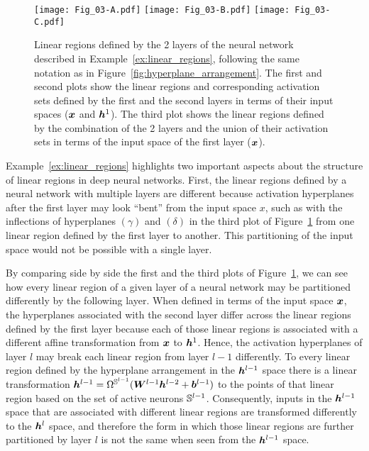 \begin{figure}
    \centering
    \texttt{[image: Fig\_03-A.pdf]}
    \texttt{[image: Fig\_03-B.pdf]} 
    \texttt{[image: Fig\_03-C.pdf]}
    \caption{Linear regions defined by the 2 layers of the neural network described in Example~\ref{ex:linear_regions}, 
    following the same notation as in Figure~\ref{fig:hyperplane_arrangement}. The first and second plots show the linear regions and corresponding activation sets defined by the first and the second layers in terms of their input spaces (${\bm{x}}$ and ${\bm{h}}^1$). The third plot shows the linear regions defined by the combination of the 2 layers and the union of their activation sets in terms of the input space of the first layer (${\bm{x}}$).}
    \label{fig:linear_regions}
\end{figure}

Example~\ref{ex:linear_regions} highlights two important aspects about the structure of linear regions in deep neural networks. 
First, the linear regions defined by a neural network with multiple layers are different because activation hyperplanes after the first layer may look ``bent'' from the input space $x$, 
such as with the inflections of hyperplanes $(\gamma)$ and $(\delta)$ in the third plot of Figure~\ref{fig:linear_regions} from one linear region defined by the first layer to another. 
This partitioning of the input space would not be possible with a single layer. 

By comparing side by side the first and the third plots of Figure~\ref{fig:linear_regions}, 
we can see  how every linear region of a given layer of a neural network may be partitioned differently by the following layer. 
When defined in terms of the input space ${\bm{x}}$, 
the hyperplanes associated with the second layer differ across the linear regions defined by the first layer 
because each of those linear regions is associated with a different affine transformation from ${\bm{x}}$ to ${\bm{h}}^1$. 
Hence, the activation hyperplanes of layer $l$ may break each linear region from layer $l-1$ differently. 
To every linear region defined by the hyperplane arrangement in the ${\bm{h}}^{l-1}$ space there is a linear transformation ${\bm{h}}^{l-1} = \Omega^{{\mathbb{S}}^{l-1}}({\bm{W}}^{l-1} {\bm{h}}^{l-2} + {\bm{b}}^{l-1})$ to the points of that linear region based on the set of active neurons ${\mathbb{S}}^{l-1}$. 
%
Consequently, inputs in the ${\bm{h}}^{l-1}$ space that are associated with different linear regions are transformed differently to the ${\bm{h}}^l$ space, and therefore the form in which those linear regions are further partitioned by layer $l$ is not the same when seen from the ${\bm{h}}^{l-1}$ space. 

